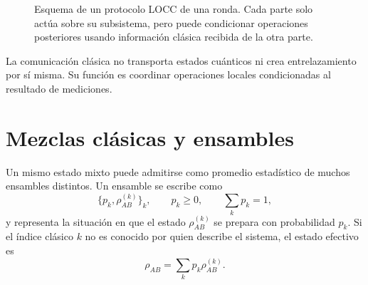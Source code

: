 \documentclass[../main.tex]{subfiles}
\begin{document}
\begin{figure}[H]
\centering
\shorthandoff{<>}
\shorthandon{<>}
\caption{Esquema de un protocolo LOCC de una ronda. Cada parte solo actúa sobre su subsistema, pero puede condicionar operaciones posteriores usando información clásica recibida de la otra parte.}
\label{fig:locc-una-ronda}
\end{figure}

La comunicación clásica no transporta estados cuánticos ni crea entrelazamiento por sí misma. Su función es coordinar operaciones locales condicionadas al resultado de mediciones.

\section{Mezclas clásicas y ensambles}

Un mismo estado mixto puede admitirse como promedio estadístico de muchos ensambles distintos. Un ensamble se escribe como
\begin{equation*}
    \{p_k,\rho_{AB}^{(k)}\}_{k},
    \qquad
    p_k\geq0,
    \qquad
    \sum_k p_k=1,
\end{equation*}
y representa la situación en que el estado \(\rho_{AB}^{(k)}\) se prepara con probabilidad \(p_k\). Si el índice clásico \(k\) no es conocido por quien describe el sistema, el estado efectivo es
\begin{equation}
    \rho_{AB}=\sum_k p_k\rho_{AB}^{(k)}.
    \label{eq:mezcla-clasica}
\end{equation}
\end{document}
